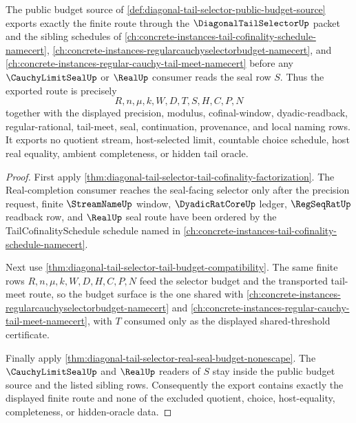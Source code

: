 \begin{theorem}
\label{thm:diagonal-tail-selector-public-budget-export}
The public budget source of
\autoref{def:diagonal-tail-selector-public-budget-source} exports exactly
the finite route through the $\DiagonalTailSelectorUp$ packet and the
sibling schedules of
\autoref{ch:concrete-instances-tail-cofinality-schedule-namecert},
\autoref{ch:concrete-instances-regularcauchyselectorbudget-namecert}, and
\autoref{ch:concrete-instances-regular-cauchy-tail-meet-namecert} before
any $\CauchyLimitSealUp$ or $\RealUp$ consumer reads the seal row $S$.
Thus the exported route is precisely
$$
R,n,\mu,k,W,D,T,S,H,C,P,N
$$
together with the displayed precision, modulus, cofinal-window,
dyadic-readback, regular-rational, tail-meet, seal, continuation,
provenance, and local naming rows. It exports no quotient stream,
host-selected limit, countable choice schedule, host real equality,
ambient completeness, or hidden tail oracle.
\end{theorem}
\begin{proof}
First apply
\autoref{thm:diagonal-tail-selector-tail-cofinality-factorization}. The
Real-completion consumer reaches the seal-facing selector only after the
precision request, finite $\StreamNameUp$ window, $\DyadicRatCoreUp$
ledger, $\RegSeqRatUp$ readback row, and $\RealUp$ seal route have been
ordered by the TailCofinalitySchedule schedule named in
\autoref{ch:concrete-instances-tail-cofinality-schedule-namecert}.

Next use
\autoref{thm:diagonal-tail-selector-tail-budget-compatibility}. The same
finite rows $R,n,\mu,k,W,D,H,C,P,N$ feed the selector budget and the
transported tail-meet route, so the budget surface is the one shared with
\autoref{ch:concrete-instances-regularcauchyselectorbudget-namecert} and
\autoref{ch:concrete-instances-regular-cauchy-tail-meet-namecert}, with
$T$ consumed only as the displayed shared-threshold certificate.

Finally apply
\autoref{thm:diagonal-tail-selector-real-seal-budget-nonescape}. The
$\CauchyLimitSealUp$ and $\RealUp$ readers of $S$ stay inside the public
budget source and the listed sibling rows. Consequently the export contains
exactly the displayed finite route and none of the excluded quotient,
choice, host-equality, completeness, or hidden-oracle data.
\end{proof}


